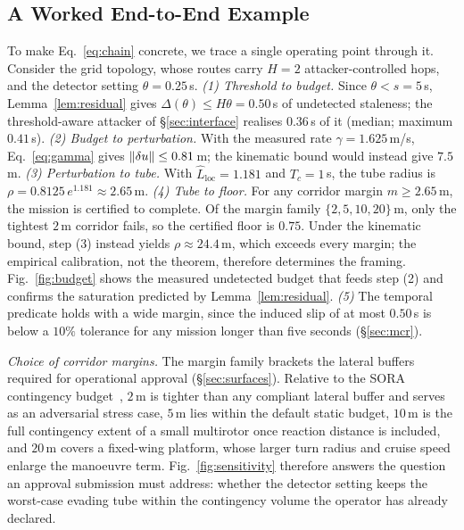 \begin{table}[t]
\centering
\caption{Instantiated constants and their provenance. The only numeric constant
still pending is the PAC--Bayes prior/posterior KL, which is flagged rather than
substituted.}
\label{tab:constants}
\footnotesize
\renewcommand{\arraystretch}{1.05}

\end{table}

\subsection{A Worked End-to-End Example}
\label{sec:worked}
To make Eq.~\eqref{eq:chain} concrete, we trace a single operating point through
it. Consider the grid topology, whose routes carry $H=2$ attacker-controlled
hops, and the detector setting $\theta=0.25$\,s. \emph{(1) Threshold to budget.}
Since $\theta<s=5$\,s, Lemma~\ref{lem:residual} gives
$\Delta(\theta)\le H\theta=0.50$\,s of undetected staleness; the
threshold-aware attacker of \S\ref{sec:interface} realises $0.36$\,s of it
(median; maximum $0.41$\,s). \emph{(2) Budget to perturbation.} With the
measured rate $\gamma=1.625$\,m/s, Eq.~\eqref{eq:gamma} gives
$\left\lVert \delta u\right\rVert\le0.81$\,m; the kinematic bound would instead give $7.5$\,m.
\emph{(3) Perturbation to tube.} With $\hat L_{\mathrm{loc}}=1.181$ and
$T_c=1$\,s, the tube radius is $\rho=0.8125\,e^{1.181}\approx2.65$\,m.
\emph{(4) Tube to floor.} For any corridor margin $m\ge2.65$\,m, the mission is
certified to complete. Of the margin family $\{2,5,10,20\}$\,m, only the
tightest $2$\,m corridor fails, so the certified floor is $0.75$. Under the
kinematic bound, step (3) instead yields $\rho\approx24.4$\,m, which exceeds
every margin; the empirical calibration, not the theorem, therefore determines
the framing. Fig.~\ref{fig:budget} shows the measured undetected budget that
feeds step (2) and confirms the saturation predicted by
Lemma~\ref{lem:residual}. \emph{(5)} The temporal predicate holds with a wide
margin, since the induced slip of at most $0.50$\,s is below a $10\%$ tolerance
for any mission longer than five seconds (\S\ref{sec:mcr}).

\emph{Choice of corridor margins.} The margin family brackets the lateral
buffers required for operational approval (\S\ref{sec:surfaces}). Relative to
the SORA contingency budget~\cite{jarus_sora25,easa_uspace2021}, $2$\,m is
tighter than any compliant lateral buffer and serves as an adversarial stress
case, $5$\,m lies within the default static budget, $10$\,m is the full
contingency extent of a small multirotor once reaction distance is included,
and $20$\,m covers a fixed-wing platform, whose larger turn radius and cruise
speed enlarge the manoeuvre term. Fig.~\ref{fig:sensitivity} therefore answers
the question an approval submission must address: whether the detector setting
keeps the worst-case evading tube within the contingency volume the operator
has already declared.

